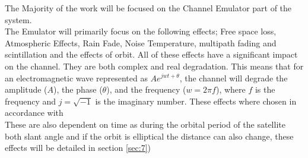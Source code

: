\documentclass[conference]{IEEEtran}
\begin{document}
The Majority of the work will be focused on the Channel Emulator part of the system.\\

The Emulator will primarily focus on the following effects; Free space loss, Atmospheric Effects, Rain Fade, Noise Temperature, multipath fading and scintillation and the effects of orbit. All of these effects have a significant impact on the channel. They are both complex and real degradation. This means that for an electromagnetic wave represented as $Ae^{j w t+\theta}$, the channel will degrade the amplitude ($A$), the phase ($\theta$), and the frequency ($w = 2\pi f$), where $f$ is the frequency and $j= \sqrt{-1}$ is the imaginary number. These effects where chosen in accordance with \cite{kaplan_understanding_2017}  \\

These are also dependent on time as during the orbital period of the satellite both slant angle \cite{seybold_introduction_2005} and if the orbit is elliptical \cite{10.5555/2601574} the distance can also change, these effects will be detailed in section \ref{sec:7})
\label{sec:intro}
\end{document}
